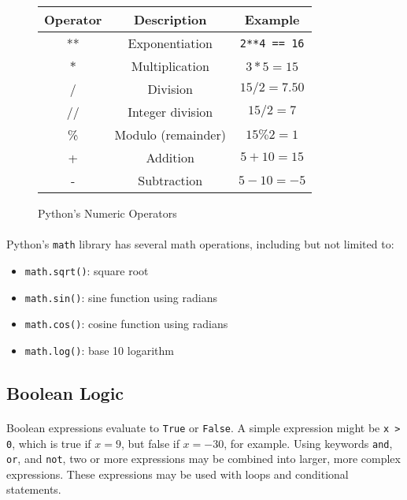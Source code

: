 \documentclass[letter,10pt]{article}
\begin{document}
\begin{figure}[htbp]
\centering
\begin{tabular}{ c c c }
 Operator & Description & Example \\
 \hline 
 **    & Exponentiation & \verb|2**4 == 16| \\
 $*$ & Multiplication & $3 * 5 = 15$ \\  
 /     & Division & $15 / 2 = 7.50$ \\
 //    & Integer division & $15 / 2 = 7$ \\
 \%  & Modulo (remainder) & $15 \% 2 = 1$ \\
 +    & Addition & $5 + 10 = 15$ \\
 -    & Subtraction & $5 - 10 = -5$
\end{tabular}
\caption{Python's Numeric Operators}
\end{figure}

\paragraph{}Python's \verb|math| library has several math operations, including but not limited to:
\begin{itemize}
    \item \verb|math.sqrt()|: square root
    \item \verb|math.sin()|: sine function using radians
    \item \verb|math.cos()|: cosine function using radians
    \item \verb|math.log()|: base 10 logarithm
\end{itemize}

\subsection{Boolean Logic}
\paragraph{}Boolean expressions evaluate to \verb|True| or \verb|False|. A simple expression might be \verb|x > 0|, which is true if $x = 9$, but false if $x = -30$, for example. Using keywords \verb|and|, \verb|or|, and \verb|not|, two or more expressions may be combined into larger, more complex expressions. These expressions may be used with loops and conditional statements.
\end{document}
